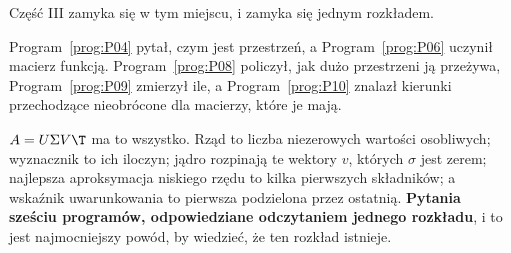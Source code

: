 \begin{fr}
Część III zamyka się w tym miejscu, i zamyka się jednym rozkładem.

Program~\ref{prog:P04} pytał, czym jest przestrzeń, a Program~\ref{prog:P06}
uczynił macierz funkcją. Program~\ref{prog:P08} policzył, jak dużo przestrzeni
ją przeżywa, Program~\ref{prog:P09} zmierzył ile, a Program~\ref{prog:P10}
znalazł kierunki przechodzące nieobrócone \dash{} dla macierzy, które je mają.

$A = U\Sigma V\T$ ma to wszystko. Rząd to liczba niezerowych wartości
osobliwych; wyznacznik to ich iloczyn; jądro rozpinają te wektory $v$, których
$\sigma$ jest zerem; najlepsza aproksymacja niskiego rzędu to kilka pierwszych
składników; a wskaźnik uwarunkowania to pierwsza podzielona przez ostatnią.
\textbf{Pytania sześciu programów, odpowiedziane odczytaniem jednego
rozkładu}, i to jest najmocniejszy powód, by wiedzieć, że ten rozkład istnieje.
\end{fr}

